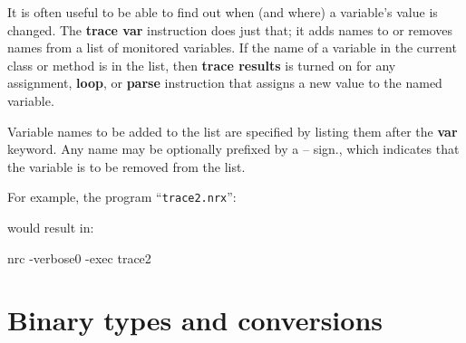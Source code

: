 It is often useful to be able to find out when (and where) a variable’s value is changed. The \textbf{trace var} instruction does just that; it adds names to or removes names from a list of monitored variables. If the name of a variable in the current class or method is in the list, then \textbf{trace results} is turned on for any assignment, \textbf{loop}, or \textbf{parse} instruction that assigns a new value to the named variable.

Variable names to be added to the list are specified by listing them after the \textbf{var} keyword. Any name may be optionally prefixed by a – sign., which indicates that the variable is to be removed from the list.

For example, the program “\texttt{trace2.nrx}”:


would result in:

\begin{shaded}
\bash[stderr]
nrc -verbose0 -exec trace2
\END
\end{shaded}


\section{Binary types and conversions}\label{binarith}

